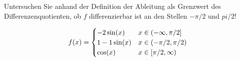 \item Untersuchen Sie anhand der Definition der Ableitung als Grenzwert des Differenzenquotienten, ob $f$ differenzierbar ist an den Stellen $-\pi/2$ und $pi/2$!

$$
  f(x) = \begin{cases}-2\sin(x) & x\in (-\infty,\-\pi/2] \\ 1-1\sin(x) & x \in (-\pi/2,\pi/2) \\ \cos(x) & x \in [\pi/2,\infty) \end{cases}
$$